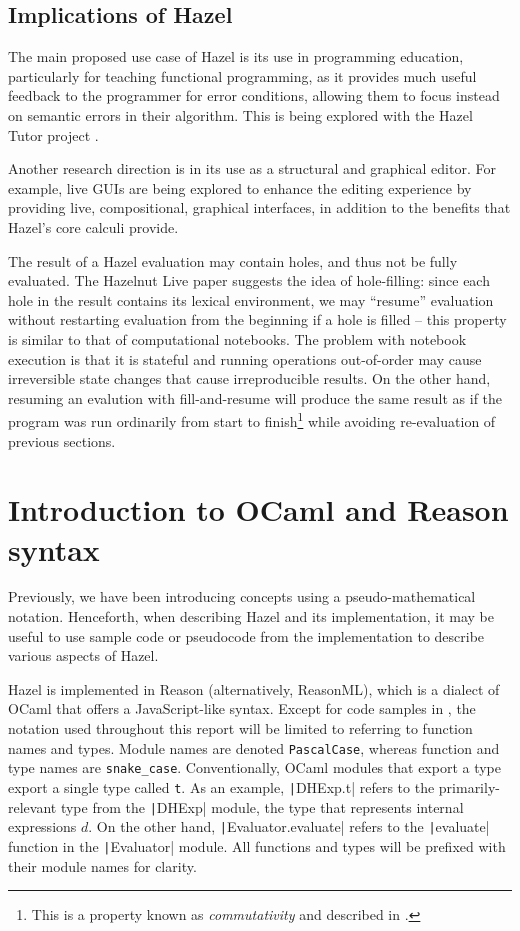 \subsection{Implications of Hazel}
\label{sec:hazel-implications}

The main proposed use case of Hazel is its use in programming education, particularly for teaching functional programming, as it provides much useful feedback to the programmer for error conditions, allowing them to focus instead on semantic errors in their algorithm. This is being explored with the Hazel Tutor project \cite{potter2020hazel}.

Another research direction is in its use as a structural and graphical editor. For example, live GUIs \cite{omar2021filling} are being explored to enhance the editing experience by providing live, compositional, graphical interfaces, in addition to the benefits that Hazel's core calculi provide.

The result of a Hazel evaluation may contain holes, and thus not be fully evaluated. The Hazelnut Live paper \cite{conf/popl/HazelnutLive19} suggests the idea of hole-filling: since each hole in the result contains its lexical environment, we may ``resume'' evaluation without restarting evaluation from the beginning if a hole is filled -- this property is similar to that of computational notebooks. The problem with notebook execution is that it is stateful and running operations out-of-order may cause irreversible state changes that cause irreproducible results. On the other hand, resuming an evalution with fill-and-resume will produce the same result as if the program was run ordinarily from start to finish\footnote{This is a property known as \textit{commutativity} and described in \cite{conf/popl/HazelnutLive19}.} while avoiding re-evaluation of previous sections.

\section{Introduction to OCaml and Reason syntax}
\label{sec:ocaml-intro}

Previously, we have been introducing concepts using a pseudo-mathematical notation. Henceforth, when describing Hazel and its implementation, it may be useful to use sample code or pseudocode from the implementation to describe various aspects of Hazel.

Hazel is implemented in Reason (alternatively, ReasonML), which is a dialect of OCaml that offers a JavaScript-like syntax. Except for code samples in , the notation used throughout this report will be limited to referring to function names and types. Module names are denoted \texttt{PascalCase}, whereas function and type names are \texttt{snake\_case}. Conventionally, OCaml modules that export a type export a single type called \texttt{t}. As an example, \texttt|DHExp.t| refers to the primarily-relevant type from the \texttt|DHExp| module, the type that represents internal expressions $d$. On the other hand, \texttt|Evaluator.evaluate| refers to the \texttt|evaluate| function in the \texttt|Evaluator| module. All functions and types will be prefixed with their module names for clarity.

